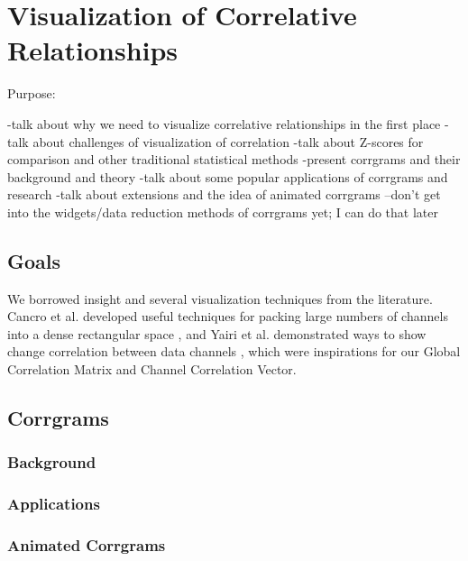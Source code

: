 \chapter{Visualization of Correlative Relationships}

Purpose:

-talk about why we need to visualize correlative relationships in the first place
-talk about challenges of visualization of correlation
-talk about Z-scores for comparison and other traditional statistical methods
-present corrgrams and their background and theory
-talk about some popular applications of corrgrams and research
-talk about extensions and the idea of animated corrgrams
--don't get into the widgets/data reduction methods of corrgrams yet; I can do that later


\section{Goals}



We borrowed insight and several visualization techniques from the literature. Cancro et al. developed useful techniques for packing large numbers of channels into a dense rectangular space \cite{Cancro}, and Yairi et al. demonstrated ways to show change correlation between data channels \cite{Yairi}, which were inspirations for our Global Correlation Matrix and Channel Correlation Vector. 



\section{Corrgrams}

\subsection{Background}

\subsection{Applications}

\subsection{Animated Corrgrams}

